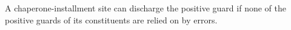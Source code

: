


A chaperone-installment site can discharge the positive guard if none of the positive guards of its constituents are relied on by errors.